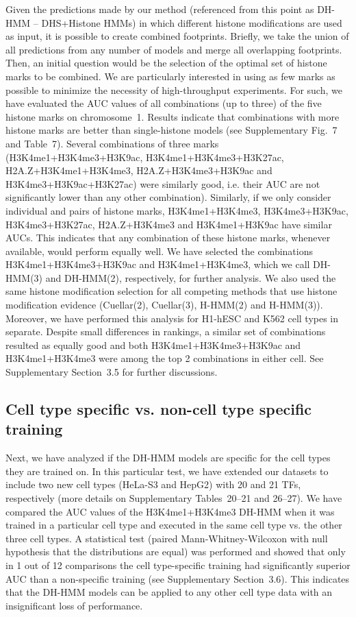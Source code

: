 \documentclass{bioinfo}
\begin{document}
Given the predictions made by our method (referenced from this point as DH-HMM --
DHS+Histone HMMs) in which different histone modifications are used as input, it is
possible to create combined footprints. Briefly, we take the union of all predictions
from any number of models and merge all overlapping footprints. Then, an initial question
would be the selection of the optimal set of histone marks to be combined. We are particularly
interested in using as few marks as possible to minimize the necessity of high-throughput
experiments. For such, we have evaluated the AUC values of all combinations (up to three)
of the five histone marks on chromosome~1. Results indicate that combinations with more histone marks
are better than single-histone models (see Supplementary Fig.~7 and Table~7). 
Several combinations of three marks (H3K4me1+H3K4me3+H3K9ac, H3K4me1+H3K4me3+H3K27ac, H2A.Z+H3K4me1+H3K4me3,
H2A.Z+H3K4me3+H3K9ac and H3K4me3+H3K9ac+H3K27ac) were similarly good, i.e. their AUC are not
significantly lower than any other combination). Similarly, if we only consider individual
and pairs of histone marks, H3K4me1+H3K4me3, H3K4me3+H3K9ac, H3K4me3+H3K27ac, H2A.Z+H3K4me3 and
H3K4me1+H3K9ac have similar AUCs. This indicates that any combination of these histone marks,
whenever available, would perform equally well. We have selected the combinations
H3K4me1+H3K4me3+H3K9ac and H3K4me1+H3K4me3, which we call DH-HMM(3) and DH-HMM(2),
respectively, for further analysis. We also used the same histone modification selection for all
competing methods that use histone modification evidence (Cuellar(2), Cuellar(3), H-HMM(2) and H-HMM(3)). 
{\color{red} Moreover, we have performed this analysis for
H1-hESC and K562 cell types in separate. Despite small differences in rankings, a similar set of combinations resulted as equally good and both H3K4me1+H3K4me3+H3K9ac and H3K4me1+H3K4me3 were among the top 2 combinations in either cell. See Supplementary Section~3.5 for further discussions.}

\subsection{Cell type specific vs. non-cell type specific training}

Next, we have analyzed if the DH-HMM models are specific for the cell types they are trained
on. In this particular test, we have extended our datasets to include two new cell types
(HeLa-S3 and HepG2) with 20 and 21 TFs, respectively (more details on Supplementary
{\color{red} Tables~20--21 and 26--27}). We have compared the AUC values of the H3K4me1+H3K4me3 DH-HMM
when it was trained in a particular cell type and executed in the same cell type vs. the other
three cell types. A statistical test (paired Mann-Whitney-Wilcoxon with null hypothesis that
the distributions are equal) was performed and showed that only in 1 out of 12 comparisons
the cell type-specific training had significantly superior AUC than a non-specific
training (see Supplementary Section~3.6). This indicates that the DH-HMM models can be
applied to any other cell type data with an insignificant loss of performance.
\end{document}
